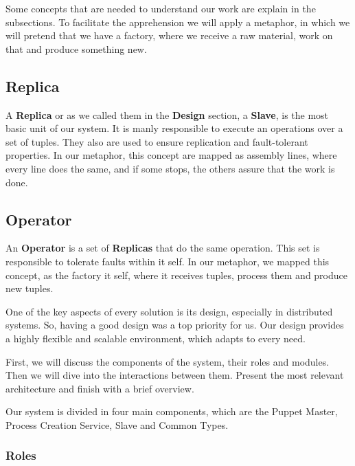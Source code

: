 \documentclass[times, 10pt,twocolumn]{article}
\begin{document}
 Some concepts that are needed to understand our work are explain in the subsections. To facilitate the apprehension we will apply a metaphor, in which we will pretend that we have a factory, where we receive a raw material, work on that and produce something new. 
 
 \subsection{Replica}
 A \textbf{Replica} or as we called them in the \textbf{Design} section, a \textbf{Slave}, is the most basic unit of our system. It is manly responsible to execute an operations over a set of tuples. They also are used to ensure replication and fault-tolerant properties. In our metaphor, this concept are mapped as assembly lines, where every line does the same, and if some stops, the others assure that the work is done.
 
 \subsection{Operator}
 An \textbf{Operator} is a set of \textbf{Replicas} that do the same operation. This set is responsible to tolerate faults within it self. In our metaphor, we mapped this concept, as the factory it self, where it receives tuples, process them and produce new tuples.




One of the key aspects of every solution is its design, especially in distributed systems. So, having a good design was a top priority for us. Our design provides a highly flexible and scalable environment, which adapts to every need.

First, we will discuss the components of the system, their roles and modules. Then we will dive into the interactions between them. Present the most relevant architecture and finish with a brief overview.


Our system is divided in four main components, which are the Puppet Master, Process Creation Service, Slave and Common Types.

\subsubsection{Roles}
\end{document}
